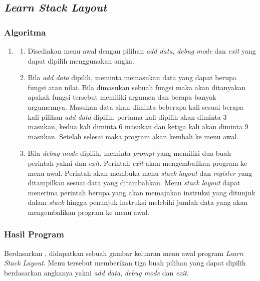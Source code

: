 \documentclass[../main.tex]{subfiles}
\begin{document}
\subsection{\textit{Learn Stack Layout}}
\subsubsection{Algoritma}
\begin{enumerate}
    \item[]
    \begin{enumerate}
        \item {Disediakan menu awal dengan pilihan \textit{add data}, \textit{debug mode} dan \textit{exit} yang dapat dipilih menggunakan angka.}
        \item {Bila \textit{add data} dipilih, meminta memasukan data yang dapat berupa fungsi atau nilai. Bila dimasukan sebuah fungsi maka akan ditanyakan apakah fungsi tersebut memiliki argumen dan berapa banyak argumennya. Masukan data akan diminta beberapa kali sesuai berapa kali pilihan \textit{add data} dipilih, pertama kali dipilih akan diminta 3 masukan, kedua kali diminta 6 masukan dan ketiga kali akan diminta 9 masukan. Setelah selesai maka program akan kembali ke menu awal.}
        \item {Bila \textit{debug mode} dipilih, meminta \textit{prompt} yang memiliki dua buah perintah yakni  dan \textit{exit}. Perintah \textit{exit} akan mengembalikan program ke menu awal. Perintah  akan membuka menu \textit{stack layout} dan \textit{register} yang ditampilkan sesuai data yang ditambahkan. Menu \textit{stack layout} dapat menerima perintah berupa  yang akan memajukan instruksi yang ditunjuk dalam \textit{stack} hingga penunjuk instruksi melebihi jumlah data yang akan mengembalikan program ke menu awal.}
    \end{enumerate}
\end{enumerate}

\subsubsection{\Flowchart}
\newpage
\subsubsectionf{{\Source} {\sCode}}
\vspace{-1ex}

\subsubsection{Hasil Program}
\begin{indentpar}
    \hspace{\parindent}Berdasarkan , didapatkan sebuah gambar keluaran menu awal program \textit{Learn Stack Layout}. Menu tersebut memberikan tiga buah pilihan yang dapat dipilih berdasarkan angkanya yakni \textit{add data}, \textit{debug mode} dan \textit{exit}.
\end{indentpar}
\end{document}
